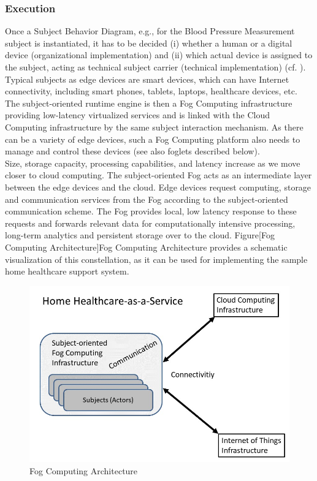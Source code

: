 \subsubsection{Execution}
Once a Subject Behavior Diagram, e.g., for the Blood Pressure Measurement subject is instantiated, it has to be decided (i) whether a human or a digital device (organizational implementation) and (ii) which actual device is assigned to the subject, acting as technical subject carrier (technical implementation) (cf. \cite{Flei12}). Typical subjects as edge devices are smart devices, which can have Internet connectivity, including smart phones, tablets, laptops, healthcare devices, etc. The subject-oriented runtime engine \cite{article:StakeHolderCentered} is then a Fog Computing infrastructure providing low-latency virtualized services and is linked with the Cloud Computing infrastructure by the same subject interaction mechanism. As there can be a variety of edge devices, such a Fog Computing platform also needs to manage and control these devices (see also foglets described below).
\\
Size, storage capacity, processing capabilities, and latency increase as we move closer to cloud computing. The subject-oriented Fog acts as an intermediate layer between the edge devices and the cloud. Edge devices request computing, storage and communication services from the Fog according to the subject-oriented communication scheme. The Fog provides local, low latency response to these requests and forwards relevant data for computationally intensive processing, long-term analytics and persistent storage over to the cloud. Figure[Fog Computing Architecture]{Fog Computing Architecture} provides a schematic visualization of this constellation, as it can be used for implementing the sample home healthcare support system.

\begin{figure}[htbp]
	\centering
	\includegraphics[width=0.6\linewidth] {Figures/Chapter5/Fog/FogArch.jpg}
	\caption[Fog Computing Architecture]{Fog Computing Architecture}
	\label{fig:FogArch}
\end{figure}

